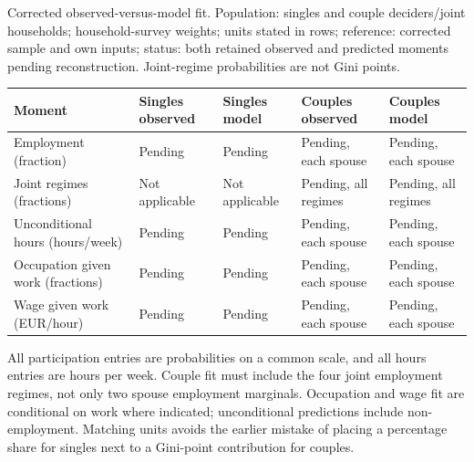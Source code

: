 \documentclass[11pt,a4paper]{article}
\begin{document}
Corrected observed-versus-model fit. Population: singles and couple deciders/joint households; household-survey weights; units stated in rows; reference: corrected sample and own inputs; status: both retained observed and predicted moments pending reconstruction. Joint-regime probabilities are not Gini points.

{ %
\small\setlength{\tabcolsep}{3pt}\begin{longtable}[]{@{}
  >{\raggedright\arraybackslash}p{}
  >{\raggedright\arraybackslash}p{}
  >{\raggedright\arraybackslash}p{}
  >{\raggedright\arraybackslash}p{}
  >{\raggedright\arraybackslash}p{}@{}}
\toprule\noalign{}
\begin{minipage}[b]{\linewidth}\raggedright
Moment
\end{minipage} & \begin{minipage}[b]{\linewidth}\raggedright
Singles observed
\end{minipage} & \begin{minipage}[b]{\linewidth}\raggedright
Singles model
\end{minipage} & \begin{minipage}[b]{\linewidth}\raggedright
Couples observed
\end{minipage} & \begin{minipage}[b]{\linewidth}\raggedright
Couples model
\end{minipage} \\
\midrule\noalign{}
\endhead
\bottomrule\noalign{}
\endlastfoot
Employment (fraction) & Pending & Pending & Pending, each spouse & Pending, each spouse \\
Joint regimes (fractions) & Not applicable & Not applicable & Pending, all regimes & Pending, all regimes \\
Unconditional hours (hours/week) & Pending & Pending & Pending, each spouse & Pending, each spouse \\
Occupation given work (fractions) & Pending & Pending & Pending, each spouse & Pending, each spouse \\
Wage given work (EUR/hour) & Pending & Pending & Pending, each spouse & Pending, each spouse \\
\end{longtable}
}

All participation entries are probabilities on a common scale, and all hours entries are hours per week. Couple fit must include the four joint employment regimes, not only two spouse employment marginals. Occupation and wage fit are conditional on work where indicated; unconditional predictions include non-employment. Matching units avoids the earlier mistake of placing a percentage share for singles next to a Gini-point contribution for couples.
\end{document}
